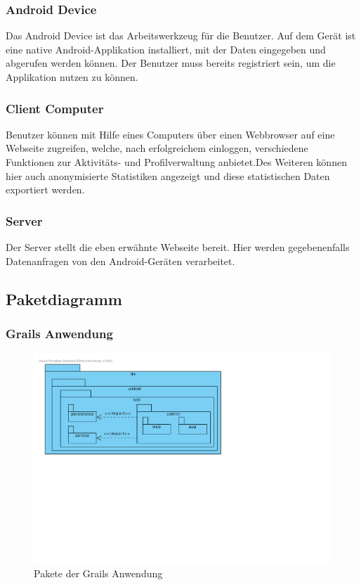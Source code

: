 \subsubsection{Android Device}
Das Android Device ist das Arbeitswerkzeug für die Benutzer. Auf dem
Gerät ist eine native Android-Applikation installiert, mit der Daten
eingegeben und abgerufen werden können. Der Benutzer muss bereits
registriert sein, um die Applikation nutzen zu können.

\subsubsection{Client Computer}
Benutzer können mit Hilfe eines Computers über einen Webbrowser auf eine Webseite zugreifen, welche, nach erfolgreichem einloggen, verschiedene Funktionen zur Aktivitäts- und Profilverwaltung anbietet.Des Weiteren können hier auch anonymisierte Statistiken angezeigt und diese statistischen Daten exportiert werden.

\subsubsection{Server}
Der Server stellt die eben erwähnte Webseite bereit. Hier werden gegebenenfalls Datenanfragen von den Android-Geräten verarbeitet.

\subsection{Paketdiagramm}

\subsubsection{Grails Anwendung}

\begin{figure}[H]
  \centering
  \includegraphics[width=\textwidth, trim=1cm 10cm 11cm 1cm, clip]{gfx/package_diagram}
  \caption{Pakete der Grails Anwendung}
\end{figure}

